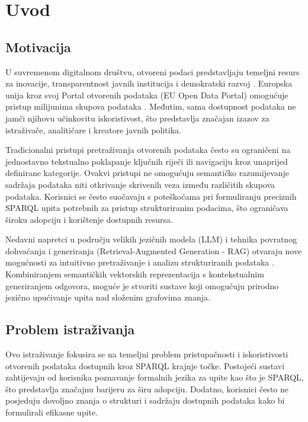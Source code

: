 \chapter{Uvod}
\label{ch:introduction}


\section{Motivacija}
\label{sec:motivation}

U suvremenom digitalnom društvu, otvoreni podaci predstavljaju temeljni resurs za inovacije, transparentnost javnih institucija i demokratski razvoj \cite{janssen2012benefits, charalabidis2018open, bizer2009linked}. Europska unija kroz svoj Portal otvorenih podataka (EU Open Data Portal) omogućuje pristup milijunima skupova podataka \cite{wilson2013developing}. Međutim, sama dostupnost podataka ne jamči njihovu učinkovitu iskoristivost, što predstavlja značajan izazov za istraživače, analitičare i kreatore javnih politika.

Tradicionalni pristupi pretraživanja otvorenih podataka često su ograničeni na jednostavno tekstualno poklapanje ključnih riječi ili navigaciju kroz unaprijed definirane kategorije. Ovakvi pristupi ne omogućuju semantičko razumijevanje sadržaja podataka niti otkrivanje skrivenih veza između različitih skupova podataka. Korisnici se često suočavaju s poteškoćama pri formuliranju preciznih SPARQL upita potrebnih za pristup strukturiranim podacima, što ograničava široku adopciju i korištenje dostupnih resursa.

Nedavni napretci u području velikih jezičnih modela (LLM) i tehnika povratnog dohvaćanja i generiranja (Retrieval-Augmented Generation - RAG) otvaraju nove mogućnosti za intuitivno pretraživanje i analizu strukturiranih podataka \cite{brown2020language, lewis2020retrieval, liu2023survey}. Kombiniranjem semantičkih vektorskih reprezentacija s kontekstualnim generiranjem odgovora, moguće je stvoriti sustave koji omogućuju prirodno jezično upućivanje upita nad složenim grafovima znanja.

\section{Problem istraživanja}
\label{sec:research_problem}

Ovo istraživanje fokusira se na temeljni problem pristupačnosti i iskoristivosti otvorenih podataka dostupnih kroz SPARQL krajnje točke. Postojeći sustavi zahtijevaju od korisnika poznavanje formalnih jezika za upite kao što je SPARQL, što predstavlja značajnu barijeru za širu adopciju. Dodatno, korisnici često ne posjeduju dovoljno znanja o strukturi i sadržaju dostupnih podataka kako bi formulirali efikasne upite.

